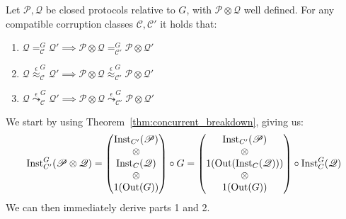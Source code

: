 \begin{theorem}
  Let $\mathscr{P}, \mathscr{Q}$ be closed protocols relative to $G$, with $\mathscr{P} \otimes \mathscr{Q}$
  well defined. For any compatible corruption classes $\mathscr{C}, \mathscr{C}'$
  it holds that:
  \begin{enumerate}
    \item $\mathscr{Q} =^G_{\mathscr{C}} \mathscr{Q}' \implies \mathscr{P} \otimes \mathscr{Q} =^G_{\mathscr{C}'} \mathscr{P} \otimes \mathscr{Q}'$
    \item $\mathscr{Q} \overset{\epsilon}{\approx}^G_{\mathscr{C}} \mathscr{Q}' \implies \mathscr{P} \otimes \mathscr{Q} \overset{\epsilon}{\approx}^G_{\mathscr{C}'} \mathscr{P} \otimes \mathscr{Q}'$
    \item $\mathscr{Q} \overset{\epsilon}{\leadsto}^G_{\mathscr{C}} \mathscr{Q}' \implies \mathscr{P} \otimes \mathscr{Q} \overset{\epsilon}{\leadsto}^G_{\mathscr{C}'} \mathscr{P} \otimes \mathscr{Q}'$
  \end{enumerate}

   We start by using Theorem~\ref{thm:concurrent_breakdown}, giving us:
  $$
  \text{Inst}^G_{C'}(\mathscr{P} \otimes \mathscr{Q})
  =
  \begin{pmatrix}
    \text{Inst}_{C'}(\mathscr{P})\cr
    \otimes\cr
    \text{Inst}_C(\mathscr{Q})\cr
    \otimes\cr
    1(\text{Out}(G))
  \end{pmatrix}
  \circ G
  =
  \begin{pmatrix}
    \text{Inst}_{C'}(\mathscr{P})\cr
    \otimes\cr
    1(\text{Out}(\text{Inst}_C(\mathscr{Q})))\cr
    \otimes\cr
    1(\text{Out}(G))
  \end{pmatrix}
  \circ
  \text{Inst}^G_C(\mathscr{Q})
  $$
  We can then immediately derive parts 1 and 2.


\end{theorem}
